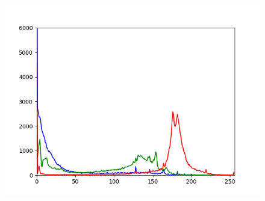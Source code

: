 \documentclass[a4paper,12pt,oneside]{article}
\begin{document}
\begin{figure}[htb]
\begin{minipage}[c]{0.08\textwidth}
\end{minipage}
\hfill
\begin{minipage}[c]{0.3\textwidth}
\includegraphics[width=\textwidth]{Sources/Bild1_HS_histo.png}
\end{minipage}
\end{figure}
\end{document}
